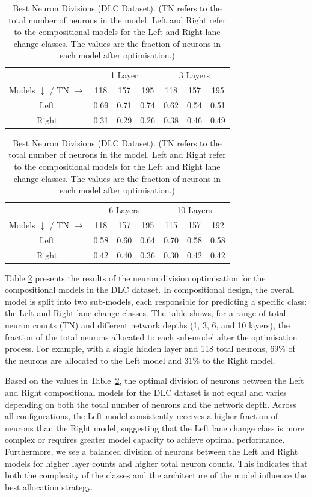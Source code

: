 \begin{table}[hbt]
    \centering
    \caption{Best Neuron Divisions (DLC Dataset).
    (TN refers to the total number of neurons in the model. Left and Right refer to the compositional models for the Left and Right lane change classes. The values are the fraction of neurons in each model after optimisation.)}
    \begin{tabular}{|c|ccc|ccc|}
    \hline
    & \multicolumn{3}{c|}{1 Layer} & \multicolumn{3}{c|}{3 Layers} \\
    Models $\downarrow$ / TN $\rightarrow$ & 118 & 157 & 195 & 118 & 157 & 195 \\
    \hline
    Left & 0.69 & 0.71 & 0.74 & 0.62 & 0.54 & 0.51 \\
    Right & 0.31 & 0.29 & 0.26 & 0.38 & 0.46 & 0.49 \\
    \hline
    \end{tabular}%
   
    \begin{tabular}{|c|ccc|ccc|}
    \hline
    & \multicolumn{3}{c|}{6 Layers} & \multicolumn{3}{c|}{10 Layers}\\
    Models $\downarrow$ / TN $\rightarrow$ & 118 & 157 & 195 & 115 & 157 & 192 \\
    \hline
    Left & 0.58 & 0.60 & 0.64 & 0.70 & 0.58 & 0.58 \\
    Right & 0.42 & 0.40 & 0.36 & 0.30 & 0.42 & 0.42 \\
    \hline
    \end{tabular}%
    \label{tab:optimal_division}
\end{table}

Table \ref{tab:optimal_division} presents the results of the neuron division optimisation for the compositional models in the DLC dataset. In compositional design, the overall model is split into two sub-models, each responsible for predicting a specific class: the Left and Right lane change classes. The table shows, for a range of total neuron counts (TN) and different network depths (1, 3, 6, and 10 layers), the fraction of the total neurons allocated to each sub-model after the optimisation process. For example, with a single hidden layer and 118 total neurons, 69\% of the neurons are allocated to the Left model and 31\% to the Right model.  

Based on the values in Table~\ref{tab:optimal_division}, the optimal division of neurons between the Left and Right compositional models for the DLC dataset is not equal and varies depending on both the total number of neurons and the network depth. Across all configurations, the Left model consistently receives a higher fraction of neurons than the Right model, suggesting that the Left lane change class is more complex or requires greater model capacity to achieve optimal performance. Furthermore, we see a balanced division of neurons between the Left and Right models for higher layer counts and higher total neuron counts. This indicates that both the complexity of the classes and the architecture of the model influence the best allocation strategy.




